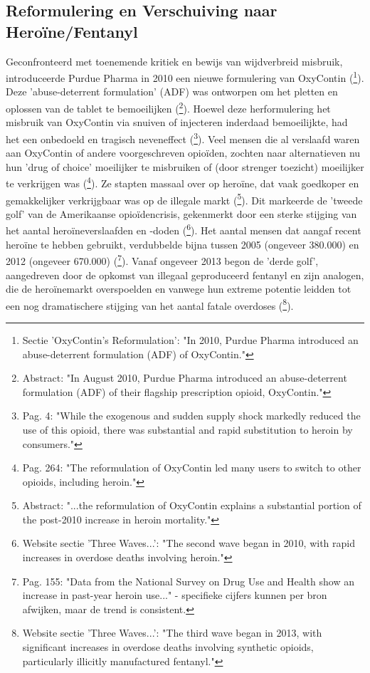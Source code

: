 \documentclass[11pt, a4paper]{report} %
\begin{document}
\subsection{Reformulering en Verschuiving naar Heroïne/Fentanyl}
Geconfronteerd met toenemende kritiek en bewijs van wijdverbreid misbruik, introduceerde Purdue Pharma in 2010 een nieuwe formulering van OxyContin (\cite{HealthlineDopesickTruth}\footnote{Sectie 'OxyContin’s Reformulation': "In 2010, Purdue Pharma introduced an abuse-deterrent formulation (ADF) of OxyContin."}). Deze 'abuse-deterrent formulation' (ADF) was ontworpen om het pletten en oplossen van de tablet te bemoeilijken (\cite{Alpert2018SupplySideOxyContin}\footnote{Abstract: "In August 2010, Purdue Pharma introduced an abuse-deterrent formulation (ADF) of their flagship prescription opioid, OxyContin."}). Hoewel deze herformulering het misbruik van OxyContin via snuiven of injecteren inderdaad bemoeilijkte, had het een onbedoeld en tragisch neveneffect (\cite{Maclean2020EconomicStudiesOpioid}\footnote{Pag. 4: "While the exogenous and sudden supply shock markedly reduced the use of this opioid, there was substantial and rapid substitution to heroin by consumers."}). Veel mensen die al verslaafd waren aan OxyContin of andere voorgeschreven opioïden, zochten naar alternatieven nu hun 'drug of choice' moeilijker te misbruiken of (door strenger toezicht) moeilijker te verkrijgen was (\cite{Cicero2017Review}\footnote{Pag. 264: "The reformulation of OxyContin led many users to switch to other opioids, including heroin."}). Ze stapten massaal over op heroïne, dat vaak goedkoper en gemakkelijker verkrijgbaar was op de illegale markt (\cite{EvansLieberPower2019OxycontinHeroin}\footnote{Abstract: "...the reformulation of OxyContin explains a substantial portion of the post-2010 increase in heroin mortality."}). Dit markeerde de 'tweede golf' van de Amerikaanse opioïdencrisis, gekenmerkt door een sterke stijging van het aantal heroïneverslaafden en -doden (\cite{CDCUnderstandingEpidemic}\footnote{Website sectie 'Three Waves...': "The second wave began in 2010, with rapid increases in overdose deaths involving heroin."}). Het aantal mensen dat aangaf recent heroïne te hebben gebruikt, verdubbelde bijna tussen 2005 (ongeveer 380.000) en 2012 (ongeveer 670.000) (\cite{Compton2016RelationshipPrescriptionOpioidHeroin}\footnote{Pag. 155: "Data from the National Survey on Drug Use and Health show an increase in past-year heroin use..." - specifieke cijfers kunnen per bron afwijken, maar de trend is consistent.}). Vanaf ongeveer 2013 begon de 'derde golf', aangedreven door de opkomst van illegaal geproduceerd fentanyl en zijn analogen, die de heroïnemarkt overspoelden en vanwege hun extreme potentie leidden tot een nog dramatischere stijging van het aantal fatale overdoses (\cite{CDCUnderstandingEpidemic}\footnote{Website sectie 'Three Waves...': "The third wave began in 2013, with significant increases in overdose deaths involving synthetic opioids, particularly illicitly manufactured fentanyl."}).
\end{document}
